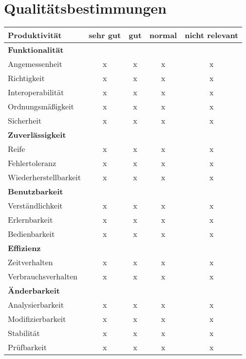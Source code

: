 \documentclass[parskip=full,11pt]{scrartcl}
\begin{document}
\section{Qualitätsbestimmungen}

\renewcommand{\arraystretch}{1.5}
\begin{table}[H]
  \begin{center}
    \begin{tabularx}{\textwidth}{X c c c c}
      \hline
      
      \textbf{{\large Produktivität}} & \textbf{{\large sehr gut}} & \textbf{{\large gut}} & \textbf{{\large normal} } &\textbf{{\large nicht relevant }}\\
      
      \hline      
      \multicolumn{5}{l}{\textbf{Funktionalität}}\\      
      \hline      
      Angemessenheit & x & x & x & x\\
	  Richtigkeit & x & x & x & x\\
	  Interoperabilität & x & x & x & x\\
	  Ordnungsmäßigkeit & x & x & x & x\\	
      Sicherheit & x & x & x & x\\	
		    
	  \hline	  
      \multicolumn{5}{l}{\textbf{Zuverlässigkeit}}\\     
      \hline
      Reife & x & x & x & x\\
	  Fehlertoleranz & x & x & x & x\\
	  Wiederherstellbarkeit & x & x & x & x\\
		
	  \hline	  	
	  \multicolumn{5}{l}{\textbf{Benutzbarkeit}}\\
      \hline
      Verständlichkeit & x & x & x & x\\
	  Erlernbarkeit & x & x & x & x\\
	  Bedienbarkeit & x & x & x & x\\
	  
	  \hline	  	
	  \multicolumn{5}{l}{\textbf{Effizienz}}\\
      \hline
      Zeitverhalten & x & x & x & x\\
	  Verbrauchsverhalten & x & x & x & x\\	
	  
	  \hline	  	
	  \multicolumn{5}{l}{\textbf{Änderbarkeit}}\\
      \hline
      Analysierbarkeit & x & x & x & x\\
	  Modifizierbarkeit & x & x & x & x\\
	  Stabilität & x & x & x & x\\
	  Prüfbarkeit & x & x & x & x\\
	  

\end{tabularx}
\end{center}
\end{table}
\end{document}
